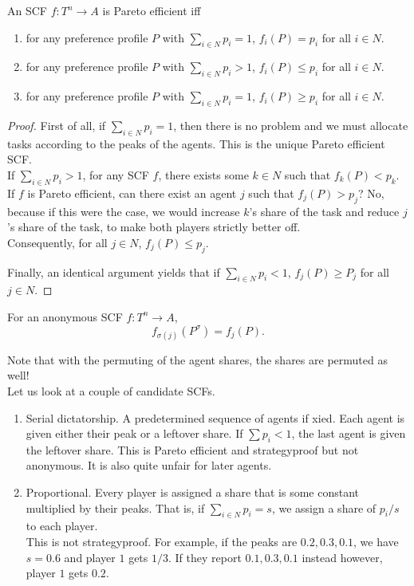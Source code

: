 		\begin{flem}
			\label{lem: task allocation pe}
			An SCF $f : T^n \to A$ is Pareto efficient iff
			\begin{enumerate}
				\item for any preference profile $P$ with $\sum_{i \in N} p_i = 1$, $f_i(P) = p_i$ for all $i \in N$.
				\item for any preference profile $P$ with $\sum_{i \in N} p_i > 1$, $f_i(P) \le p_i$ for all $i \in N$.
				\item for any preference profile $P$ with $\sum_{i \in N} p_i = 1$, $f_i(P) \ge p_i$ for all $i \in N$.
			\end{enumerate}
		\end{flem}
		\begin{proof}
			First of all, if $\sum_{i \in N} p_i = 1$, then there is no problem and we must allocate tasks according to the peaks of the agents. This is the unique Pareto efficient SCF.\\

			If $\sum_{i \in N} p_i > 1$, for any SCF $f$, there exists some $k \in N$ such that $f_k(P) < p_k$.\\
			If $f$ is Pareto efficient, can there exist an agent $j$ such that $f_j(P) > p_j$? No, because if this were the case, we would increase $k$'s share of the task and reduce $j$'s share of the task, to make both players strictly better off.\\
			Consequently, for all $j \in N$, $f_j(P) \le p_j$.

			Finally, an identical argument yields that if $\sum_{i \in N} p_i < 1$, $f_j(P) \ge P_j$ for all $j \in N$.
		\end{proof}


		\begin{fdef}[Anonymity]
			For an anonymous SCF $f : T^n \to A$,
			\[ f_{\sigma(j)}(P^\sigma) = f_j(P). \]
		\end{fdef}
		Note that with the permuting of the agent shares, the shares are permuted as well!\\

		Let us look at a couple of candidate SCFs.
		\begin{enumerate}
			\item Serial dictatorship. A predetermined sequence of agents if xied. Each agent is given either their peak or a leftover share. If $\sum p_i < 1$, the last agent is given the leftover share. This is Pareto efficient and strategyproof but not anonymous. It is also quite unfair for later agents.
			\item Proportional. Every player is assigned a share that is some constant multiplied by their peaks. That is, if $\sum_{i \in N} p_i = s$, we assign a share of $p_i/s$ to each player.\\
			This is not strategyproof. For example, if the peaks are $0.2,0.3,0.1$, we have $s = 0.6$ and player $1$ gets $1/3$. If they report $0.1,0.3,0.1$ instead however, player $1$ gets $0.2$.
		\end{enumerate}

